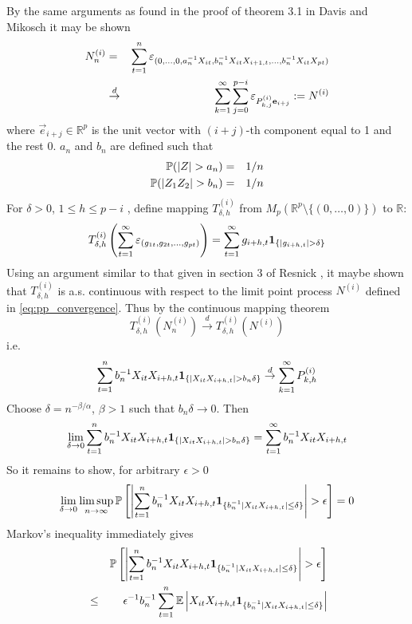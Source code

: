\documentclass{article}
\begin{document}
By the same arguments as found in the proof of theorem 3.1 in Davis
and Mikosch \cite{davis2001} it may be shown
\begin{eqnarray}
  N^{(i)}_n &=& \sum_{t=1}^n \pop{(0,\dots,0, a_n^{-1} X_{it}, b_n^{-1} X_{it} X_{i+1,
                t}, \dots, b_n^{-1} X_{it} X_{pt})} \nonumber \\
            &\overset{d}{\to}& \sum_{k=1}^\infty \sum_{j=0}^{p-i}
                               \pop{P^{(i)}_{k,j} \vec{e}_{i+j}} :=
                               N^{(i)}   \label{eq:pp_convergence}
\end{eqnarray}
where $\vec{e}_{i+j} \in \mathds R^{p}$ is the unit vector with $(i+j)$-th
component equal to 1 and the rest 0. $a_n$ and $b_n$ are defined such
that 
\begin{eqnarray*}
  \P(|Z| > a_n) &=& 1/n \\
  \P(|Z_1 Z_2| > b_n) &=& 1/n
\end{eqnarray*}
For $\delta > 0$, $1 \leq h \leq p-i$ , define mapping
$T^{(i)}_{\delta, h} $ from $M_p(\mathds R^p \setminus \{(0,
\dots, 0)\})$ to $\mathds R$:
\[
T^{(i)}_{\delta, h} \left(\sum_{t=1}^\infty \pop{(g_{1t}, g_{2t},
    \dots, g_{pt})}\right) = \sum_{t=1}^\infty g_{i+h, t}
\1{|g_{i+h,t}|> \delta}
\]
Using an argument similar to that given in section 3 of Resnick
\cite{Resnick1986}, it maybe shown that $T^{(i)}_{\delta, h}$ is a.s. continuous
with respect to the limit point process $N^{(i)}$ defined in
\eqref{eq:pp_convergence}. Thus by the continuous mapping theorem
\[
T^{(i)}_{\delta, h}(N^{(i)}_n) \overset{d}{\to} T^{(i)}_{\delta, h}(N^{(i)})
\]
i.e.
\[
\sum_{t=1}^n b_n^{-1} X_{it} X_{i+h, t}\1{|X_{it} X_{i+h,t}| > b_n \delta} \overset{d}{\to}
\sum_{k=1}^\infty P^{(i)}_{k,h}
\]
Choose $\delta = n^{-\beta/\alpha}$, $\beta > 1$ such that $b_n \delta
\to 0$. Then 
\[
\lim_{\delta \to 0} \sum_{t=1}^n b_n^{-1} X_{it} X_{i+h, t}
\1{|X_{it} X_{i+h,t}| > b_n \delta} = \sum_{t=1}^\infty b_n^{-1}
X_{it} X_{i+h, t}
\]
So it remains to show, for arbitrary $\epsilon > 0$
\begin{equation}
  \label{eq:diff_to_0}
  \lim_{\delta \to 0} \limsup_{n \to \infty} \P\left[
    \left|\sum_{t=1}^n b_n^{-1} X_{it} X_{i+h, t} \1{b_n^{-1} |X_{it} X_{i+h,
          t}| \leq \delta} \right| > \epsilon\right] = 0
\end{equation}
Markov's inequality immediately gives
\begin{eqnarray*}
  && \P\left[\left|\sum_{t=1}^n b_n^{-1} X_{it} X_{i+h, t} \1{b_n^{-1} |X_{it}
        X_{i+h, t}| \leq \delta} \right|> \epsilon \right] \\
  &\leq& \epsilon^{-1} b_n^{-1} \sum_{t=1}^n \E \left|X_{it}
    X_{i+h, t}\1{b_n^{-1} |X_{it} X_{i+h, t} | \leq \delta} \right|
\end{eqnarray*}
\end{document}
